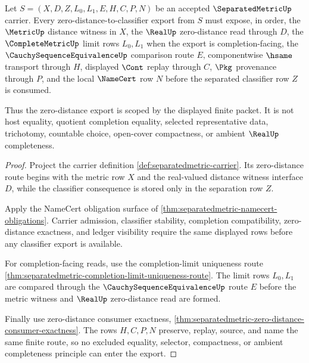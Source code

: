 \begin{theorem}
\label{thm:separatedmetric-zero-distance-scope-obligations}
Let $S=(X,D,Z,L_0,L_1,E,H,C,P,N)$ be an accepted $\SeparatedMetricUp$ carrier. Every zero-distance-to-classifier export from $S$ must expose, in order, the $\MetricUp$ distance witness in $X$, the $\RealUp$ zero-distance read through $D$, the $\CompleteMetricUp$ limit rows $L_0,L_1$ when the export is completion-facing, the $\CauchySequenceEquivalenceUp$ comparison route $E$, componentwise $\hsame$ transport through $H$, displayed $\Cont$ replay through $C$, $\Pkg$ provenance through $P$, and the local $\NameCert$ row $N$ before the separated classifier row $Z$ is consumed.

Thus the zero-distance export is scoped by the displayed finite packet. It is not host equality, quotient completion equality, selected representative data, trichotomy, countable choice, open-cover compactness, or ambient $\RealUp$ completeness.
\end{theorem}
\begin{proof}
Project the carrier definition \autoref{def:separatedmetric-carrier}. Its zero-distance route begins with the metric row $X$ and the real-valued distance witness interface $D$, while the classifier consequence is stored only in the separation row $Z$.

Apply the NameCert obligation surface of \autoref{thm:separatedmetric-namecert-obligations}. Carrier admission, classifier stability, completion compatibility, zero-distance exactness, and ledger visibility require the same displayed rows before any classifier export is available.

For completion-facing reads, use the completion-limit uniqueness route \autoref{thm:separatedmetric-completion-limit-uniqueness-route}. The limit rows $L_0,L_1$ are compared through the $\CauchySequenceEquivalenceUp$ route $E$ before the metric witness and $\RealUp$ zero-distance read are formed.

Finally use zero-distance consumer exactness, \autoref{thm:separatedmetric-zero-distance-consumer-exactness}. The rows $H,C,P,N$ preserve, replay, source, and name the same finite route, so no excluded equality, selector, compactness, or ambient completeness principle can enter the export.
\end{proof}
